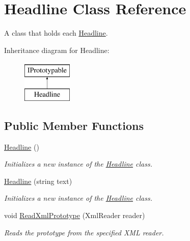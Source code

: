\hypertarget{class_headline}{}\section{Headline Class Reference}
\label{class_headline}


A class that holds each \hyperlink{class_headline}{Headline}.  


Inheritance diagram for Headline\+:\begin{figure}[H]
\begin{center}
\leavevmode
\includegraphics[height=2.000000cm]{class_headline}
\end{center}
\end{figure}
\subsection*{Public Member Functions}
\begin{DoxyCompactItemize}
\item 
\hyperlink{class_headline_ac218488286848b446e68f3d6dda5d46c}{Headline} ()
\begin{DoxyCompactList}\small\item\em Initializes a new instance of the \hyperlink{class_headline}{Headline} class. \end{DoxyCompactList}\item 
\hyperlink{class_headline_aeec63fed5d171793aecf336bb8b0896d}{Headline} (string text)
\begin{DoxyCompactList}\small\item\em Initializes a new instance of the \hyperlink{class_headline}{Headline} class. \end{DoxyCompactList}\item 
void \hyperlink{class_headline_a528e76fd6eab76aa10ef322ffe20bd1a}{Read\+Xml\+Prototype} (Xml\+Reader reader)
\begin{DoxyCompactList}\small\item\em Reads the prototype from the specified X\+ML reader. \end{DoxyCompactList}\end{DoxyCompactItemize}
